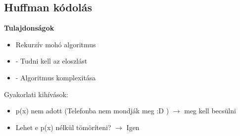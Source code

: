 \subsection{Huffman kódolás}



\textbf{Tulajdonságok}
\begin{itemize}
	\item Rekurzív mohó algoritmus
	\item - Tudni kell az eloszlást
	\item - Algoritmus komplexitása
\end{itemize}


Gyakorlati kihívások:
\begin{itemize}
	\item p(x) nem adott (Telefonba nem mondják meg :D ) $\rightarrow$ meg kell becsülni
	\item Lehet e p(x) nélkül tömöríteni? $\rightarrow$ Igen
\end{itemize}


